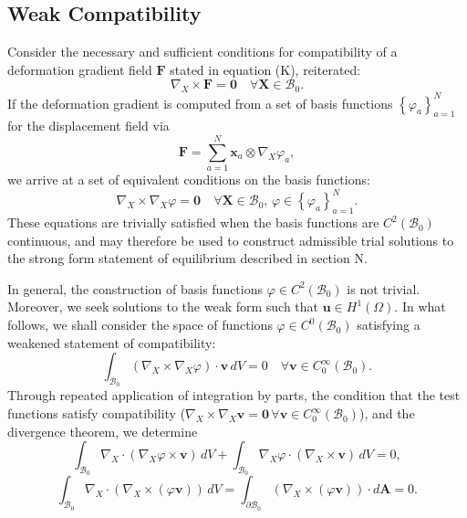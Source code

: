\documentclass[12pt]{article}
\begin{document}
\subsection*{Weak Compatibility}

Consider the necessary and sufficient conditions for compatibility of a deformation gradient field $\mathbf{F}$ stated in equation (K), reiterated:
\begin{equation}
	\nabla_X \times \mathbf{F} = \mathbf{0} \quad \forall \mathbf{X} \in \mathcal{B}_0.
\end{equation}
If the deformation gradient is computed from a set of basis functions $\left\{ \varphi_a \right\}_{a=1}^N$ for the displacement field via
\begin{equation}
	\mathbf{F} = \sum_{a=1}^N \mathbf{x}_{a} \otimes \nabla_X \varphi_{a},
\end{equation}
we arrive at a set of equivalent conditions on the basis functions:
\begin{equation}
	\nabla_X \times \nabla_X \varphi = \mathbf{0} \quad \forall \mathbf{X} \in \mathcal{B}_0, \, \varphi \in \left\{ \varphi_a \right\}_{a=1}^N.
	\label{eq:strong_compatibility}
\end{equation}
These equations are trivially satisfied when the basis functions are $C^2 (\mathcal{B}_0)$ continuous, and may therefore be used to construct admissible trial solutions to the strong form statement of equilibrium described in section N.

In general, the construction of basis functions $\varphi \in C^2 (\mathcal{B}_0)$ is not trivial. Moreover, we seek solutions to the weak form such that $\mathbf{u} \in H^1 (\Omega)$. In what follows, we shall consider the space of functions $\varphi \in C^0 (\mathcal{B}_0)$ satisfying a weakened statement of compatibility:
\begin{equation}
	\int_{\mathcal{B}_0} (\nabla_X \times \nabla_X \varphi) \cdot \mathbf{v} \, dV = 0 \quad \forall \mathbf{v} \in C^\infty_0 (\mathcal{B}_0).
\end{equation}
Through repeated application of integration by parts, the condition that the test functions satisfy compatibility ($\nabla_X \times \nabla_X \mathbf{v} = \mathbf{0} \, \forall \mathbf{v} \in C^\infty_0 (\mathcal{B}_0)$), and the divergence theorem, we determine
 \begin{equation}
	\int_{\mathcal{B}_0} \nabla_X \cdot (\nabla_X \varphi \times \mathbf{v}) \, dV + \int_{\mathcal{B}_0} \nabla_X \varphi \cdot (\nabla_X \times \mathbf{v}) \, dV = 0,
\end{equation}
\begin{equation}
	\int_{\mathcal{B}_0} \nabla_X \cdot (\nabla_X \times (\varphi \mathbf{v})) \, dV = \int_{\partial \mathcal{B}_0} (\nabla_X \times (\varphi \mathbf{v})) \cdot d\mathbf{A} = 0.
\end{equation}
\end{document}
